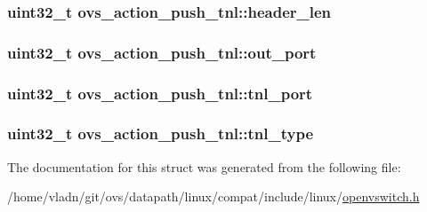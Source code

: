 \subsubsection[{header\+\_\+len}]{\setlength{\rightskip}{0pt plus 5cm}uint32\+\_\+t ovs\+\_\+action\+\_\+push\+\_\+tnl\+::header\+\_\+len}\label{structovs__action__push__tnl_ae17c0fbdac67f4393a1bf5cc463caa61}
\hypertarget{structovs__action__push__tnl_a314ef1909bc176d1fe3f6588d24edfde}{}
\subsubsection[{out\+\_\+port}]{\setlength{\rightskip}{0pt plus 5cm}uint32\+\_\+t ovs\+\_\+action\+\_\+push\+\_\+tnl\+::out\+\_\+port}\label{structovs__action__push__tnl_a314ef1909bc176d1fe3f6588d24edfde}
\hypertarget{structovs__action__push__tnl_a075797c91bf16f67b0e99d00733de09c}{}
\subsubsection[{tnl\+\_\+port}]{\setlength{\rightskip}{0pt plus 5cm}uint32\+\_\+t ovs\+\_\+action\+\_\+push\+\_\+tnl\+::tnl\+\_\+port}\label{structovs__action__push__tnl_a075797c91bf16f67b0e99d00733de09c}
\hypertarget{structovs__action__push__tnl_a5a768ff0a623d03bc2b4d13db4bd4413}{}
\subsubsection[{tnl\+\_\+type}]{\setlength{\rightskip}{0pt plus 5cm}uint32\+\_\+t ovs\+\_\+action\+\_\+push\+\_\+tnl\+::tnl\+\_\+type}\label{structovs__action__push__tnl_a5a768ff0a623d03bc2b4d13db4bd4413}


The documentation for this struct was generated from the following file\+:\begin{DoxyCompactItemize}
\item 
/home/vladn/git/ovs/datapath/linux/compat/include/linux/\hyperlink{openvswitch_8h}{openvswitch.\+h}\end{DoxyCompactItemize}
